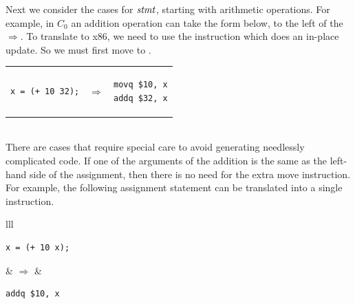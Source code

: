 \documentclass[11pt]{book}
\begin{document}
Next we consider the cases for $\mathit{stmt}$, starting with arithmetic
operations. For example, in $C_0$ an addition operation can take the
form below, to the left of the $\Rightarrow$.  To translate to x86, we
need to use the  instruction which does an in-place
update. So we must first move  to . \\
\begin{tabular}{lll}
\begin{minipage}{0.4\textwidth}
\begin{lstlisting}
x = (+ 10 32);
\end{lstlisting}
\end{minipage}
&
$\Rightarrow$
&
\begin{minipage}{0.4\textwidth}
\begin{lstlisting}
movq $10, x
addq $32, x
\end{lstlisting}
\end{minipage}
\end{tabular} \\
%
There are cases that require special care to avoid generating
needlessly complicated code. If one of the arguments of the addition
is the same as the left-hand side of the assignment, then there is no
need for the extra move instruction.  For example, the following
assignment statement can be translated into a single 
instruction.\\
\begin{tabular}{lll}
\begin{minipage}{0.4\textwidth}
\begin{lstlisting}
x = (+ 10 x);
\end{lstlisting}
\end{minipage}
&
$\Rightarrow$
&
\begin{minipage}{0.4\textwidth}
\begin{lstlisting}
addq $10, x
\end{lstlisting}
\end{minipage}
\end{tabular} \\
\end{document}
